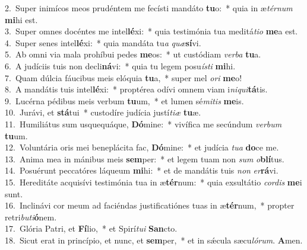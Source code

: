 {2.~}Super inimícos meos prudéntem me fecísti mandáto \textbf{tu}o:~* quia in æ\textit{tér}\textit{num} \textbf{mi}hi est.\\
{3.~}Super omnes docéntes me intel\textbf{lé}xi:~* quia testimónia tua meditá\textit{ti}\textit{o} \textbf{me}a est.\\
{4.~}Super senes intel\textbf{lé}xi:~* quia mandáta tu\textit{a} \textit{quæ}\textbf{sí}vi.\\
{5.~}Ab omni via mala prohíbui pedes \textbf{me}os:~* ut custódiam \textit{ver}\textit{ba} \textbf{tu}a.\\
{6.~}A judíciis tuis non decli\textbf{ná}vi:~* quia tu legem posu\textit{í}\textit{sti} \textbf{mi}hi.\\
{7.~}Quam dúlcia fáucibus meis elóquia \textbf{tu}a,~* super mel \textit{o}\textit{ri} \textbf{me}o!\\
{8.~}A mandátis tuis intel\textbf{lé}xi:~* proptérea odívi omnem viam i\textit{ni}\textit{qui}\textbf{tá}tis.\\
{9.~}Lucérna pédibus meis verbum \textbf{tu}um,~* et lumen sé\textit{mi}\textit{tis} \textbf{me}is.\\
{10.~}Jurávi, et \textbf{stá}tui~* custodíre judícia justí\textit{ti}\textit{æ} \textbf{tu}æ.\\
{11.~}Humiliátus sum usquequáque, \textbf{Dó}mine:~* vivífica me secúndum \textit{ver}\textit{bum} \textbf{tu}um.\\
{12.~}Voluntária oris mei beneplácita fac, \textbf{Dó}mine:~* et judícia \textit{tu}\textit{a} \textbf{do}ce me.\\
{13.~}Anima mea in mánibus meis \textbf{sem}per:~* et legem tuam non \textit{sum} \textit{o}\textbf{blí}tus.\\
{14.~}Posuérunt peccatóres láqueum \textbf{mi}hi:~* et de mandátis tuis \textit{non} \textit{er}\textbf{rá}vi.\\
{15.~}Hereditáte acquisívi testimónia tua in æ\textbf{tér}num:~* quia exsultátio \textit{cor}\textit{dis} \textbf{me}i sunt.\\
{16.~}Inclinávi cor meum ad faciéndas justificatiónes tuas in æ\textbf{tér}num,~* propter retri\textit{bu}\textit{ti}\textbf{ó}nem.\\
{17.~}Glória Patri, et \textbf{Fí}lio,~* et Spirí\textit{tu}\textit{i} \textbf{San}cto.\\
{18.~}Sicut erat in princípio, et nunc, et \textbf{sem}per,~* et in sǽcula sæcu\textit{ló}\textit{rum}. \textbf{A}men.\\
